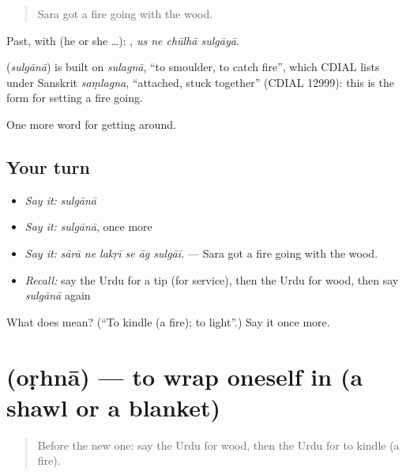 \begin{quote}
Sara got a fire going with the wood.
\end{quote}

Past, with  (he or she …):    , \emph{us ne chūlhā sulgāyā}.

\begin{cousinweb}
\textbf{} (\emph{sulgānā}) is built on \emph{sulagnā}, \textquotedblleft{}to smoulder, to catch fire\textquotedblright{}, which CDIAL lists under Sanskrit \emph{saṃlagna}, \textquotedblleft{}attached, stuck together\textquotedblright{} (CDIAL 12999): this is the form for setting a fire going.
\end{cousinweb}

\begin{grammarlens}[title={What you've built}]
One more word for getting around.
\end{grammarlens}

\subsection*{Your turn}
\begin{itemize}
\raggedright
  \item \emph{Say it:} \emph{sulgānā}
  \item \emph{Say it:} \emph{sulgānā}, once more
  \item \emph{Say it:} \emph{sārā ne lakṛī se āg sulgāī.} — Sara got a fire going with the wood.
  \item \emph{Recall:} say the Urdu for a tip (for service), then the Urdu for wood, then say \emph{sulgānā} again
\end{itemize}

\begin{tcolorbox}[breakable,colback=teal!4,colframe=teal!35!black,title={Before you move on}]
What does  mean? (\textquotedblleft{}To kindle (a fire); to light\textquotedblright{}.) Say it once more.
\end{tcolorbox}
\section[\texorpdfstring{\ur{اوڑھنا} (oṛhnā)}{اوڑھنا (oṛhnā)}]{ (oṛhnā) — to wrap oneself in (a shawl or a blanket)}

\label{lesson:UR-C406-orhna}



\begin{quote}
Before the new one: say the Urdu for wood, then the Urdu for to kindle (a fire).
\end{quote}

